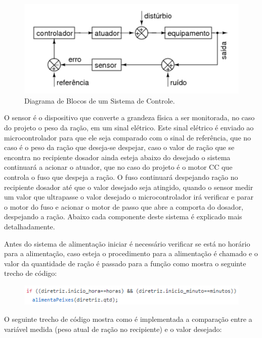 \begin{figure}[h]
\centering
\includegraphics[keepaspectratio=true,scale=0.6]{figuras/sistema_de_controle}
\caption{Diagrama de Blocos de um Sistema de Controle.}
\label{blocoscontrole}
\end{figure}

O sensor é o dispositivo que converte a grandeza física a ser monitorada, no caso do projeto o peso da ração, em um sinal elétrico. Este sinal elétrico é enviado ao microcontrolador para que ele seja comparado com o sinal de referência, que no caso é o peso da ração que deseja-se despejar, caso o valor de ração que se encontra no recipiente dosador ainda esteja abaixo do desejado o sistema continuará a acionar o atuador, que no caso do projeto é o motor CC que controla o fuso que despeja a ração. O fuso continuará despejando ração no recipiente dosador até que o valor desejado seja atingido, quando o sensor medir um valor que ultrapasse o valor desejado o microcontrolador irá verificar e parar o motor do fuso e acionar o motor de passo que abre a comporta do dosador, despejando a ração. Abaixo cada componente deste sistema é explicado mais detalhadamente.

Antes do sistema de alimentação iniciar é necessário verificar se está no horário para a alimentação, caso esteja o procedimento para a alimentação é chamado e o valor da quantidade de ração é passado para a função como mostra o seguinte trecho de código:

\begin{figure}[!h]
\centering \includegraphics[scale=0.5]{figuras/codigo_controle}
\label{codigo_controle1}
 \end{figure}

O seguinte trecho de código mostra como é implementada a comparação entre a variável medida (peso atual de ração no recipiente) e o valor desejado:

